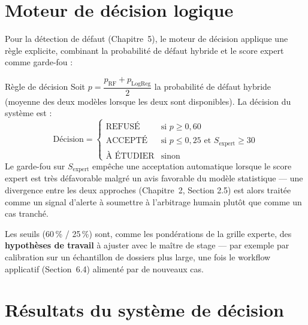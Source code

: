 \section{Moteur de décision logique}

Pour la détection de défaut (Chapitre~5), le moteur de décision applique une règle explicite,
combinant la probabilité de défaut hybride et le score expert comme garde-fou :

\begin{definition}{Règle de décision}
Soit $p = \dfrac{p_{\text{RF}} + p_{\text{LogReg}}}{2}$ la probabilité de défaut hybride (moyenne
des deux modèles lorsque les deux sont disponibles). La décision du système est :
\[
\text{Décision} =
\begin{cases}
\text{REFUSÉ} & \text{si } p \geq 0{,}60 \\
\text{ACCEPTÉ} & \text{si } p \leq 0{,}25 \text{ et } S_{\text{expert}} \geq 30 \\
\text{À ÉTUDIER} & \text{sinon}
\end{cases}
\]
Le garde-fou sur $S_{\text{expert}}$ empêche une acceptation automatique lorsque le score
expert est très défavorable malgré un avis favorable du modèle statistique — une divergence entre
les deux approches (Chapitre~2, Section 2.5) est alors traitée comme un signal d'alerte à
soumettre à l'arbitrage humain plutôt que comme un cas tranché.
\end{definition}

Les seuils (60\,\% / 25\,\%) sont, comme les pondérations de la grille experte, des
\textbf{hypothèses de travail} à ajuster avec le maître de stage — par exemple par calibration
sur un échantillon de dossiers plus large, une fois le workflow applicatif (Section~6.4)
alimenté par de nouveaux cas.

\section{Résultats du système de décision}

